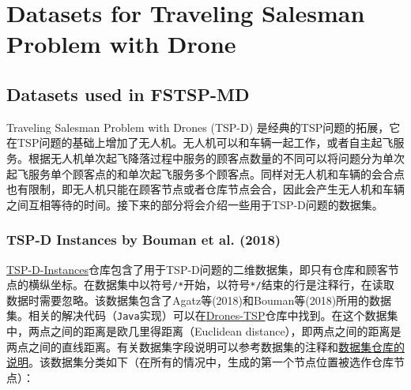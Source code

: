 \part{Datasets for Traveling Salesman Problem with Drone}

\chapter{Datasets used in FSTSP-MD}

Traveling Salesman Problem with Drones (TSP-D) 是经典的TSP问题的拓展，它在TSP问题的基础上增加了无人机。无人机可以和车辆一起工作，或者自主起飞服务。根据无人机单次起飞降落过程中服务的顾客点数量的不同可以将问题分为单次起飞服务单个顾客点的和单次起飞服务多个顾客点。同样对无人机和车辆的会合点也有限制，即无人机只能在顾客节点或者仓库节点会合，因此会产生无人机和车辆之间互相等待的时间。接下来的部分将会介绍一些用于TSP-D问题的数据集。

\section{TSP-D Instances by Bouman et al. (2018)}

\href{https://github.com/pcbouman-eur/TSP-D-Instances?tab=readme-ov-file}{TSP-D-Instances}仓库包含了用于TSP-D问题的二维数据集，即只有仓库和顾客节点的横纵坐标。在数据集中以符号\texttt{/*}开始，以符号\texttt{*/}结束的行是注释行，在读取数据时需要忽略。该数据集包含了Agatz等(2018)\cite{agatzOptimizationApproachesTraveling2018}和Bouman等(2018)\cite{boumanDynamicProgrammingApproaches2018}所用的数据集。相关的解决代码（\texttt{Java}实现）可以在\href{https://github.com/pcbouman-eur/Drones-TSP?tab=readme-ov-file}{Drones-TSP}仓库中找到。在这个数据集中，两点之间的距离是欧几里得距离（Euclidean distance），即两点之间的距离是两点之间的直线距离。有关数据集字段说明可以参考数据集的注释和\href{https://github.com/pcbouman-eur/TSP-D-Instances?tab=readme-ov-file}{数据集仓库的说明}。该数据集分类如下（在所有的情况中，生成的第一个节点位置被选作仓库节点）：

